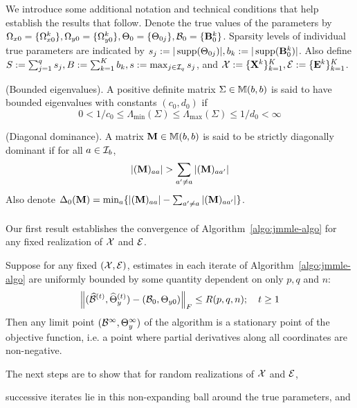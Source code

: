We introduce some additional notation and technical conditions that help establish the results that follow. Denote the true values of the parameters by $\Omega_{x 0} = \{ \Omega_{x 0}^k \}, \Omega_{y 0} = \{ \Omega_{y 0}^k \}, \Theta_0 = \{ \Theta_{0 j} \}, {\cal{B}}_0 = \{ {\mathbf{B}}_0^k \}$. Sparsity levels of individual true parameters are indicated by $s_j := | \operatorname*{supp} (\Theta_{0j})|, b_k := | \operatorname*{supp}({\mathbf{B}}^k_0) |$. Also define $S := \sum_{j=1}^q s_j, B:= \sum_{k=1}^K b_k, s:= \max_{j \in {\cal{I}}_q } s_j$, and ${\cal{X}} := \{ {\mathbf{X}}^k \}_{k=1}^K, {\cal{E}} := \{ {\mathbf{E}}^k \}_{k=1}^K$.

\vspace{1em}
 (Bounded eigenvalues). A positive definite matrix $\Sigma \in {\mathbb{M}}(b,b)$ is said to have bounded eigenvalues with constants $(c_0, d_0)$ if
%
\[
0 < 1/c_0 \leq \Lambda_{\min} (\Sigma) \leq \Lambda_{\max} (\Sigma) \leq 1/d_0 < \infty
\]

 (Diagonal dominance). A matrix ${\mathbf{M}}  \in {\mathbb{M}}(b,b)$ is said to be strictly diagonally dominant if for all $a \in {\cal{I}}_b$,
%
$$
| ({\mathbf{M}})_{aa} | > \sum_{a' \neq a} |({\mathbf{M}})_{aa'} |
$$
%
Also denote $\Delta_0 ({\mathbf{M}}) = \min_a \{ | ({\mathbf{M}})_{aa} | - \sum_{a' \neq a} |({\mathbf{M}})_{aa'} | \}$.

\paragraph{}
Our first result establishes the convergence of Algorithm~\ref{algo:jmmle-algo} for any fixed realization of ${\cal{X}}$ and ${\cal{E}}$.

\begin{theorem}
\label{thm:algo-convergence}
Suppose for any fixed $({\cal{X}}, {\cal{E}})$, estimates in each iterate of Algorithm~\ref{algo:jmmle-algo} are uniformly bounded by some quantity dependent on only $p, q$ and $n$:
%
\begin{align}
\left\| (\widehat {{\cal{B}}}^{(t)}, \widehat \Theta_y^{(t)}) - ( {\cal{B}}_0, \Theta_{y 0}) \right\|_F
\leq R(p,q,n);
\quad t \geq 1
\end{align}
%
Then any limit point $({\cal{B}}^\infty, \Theta_y^\infty)$ of the algorithm is a stationary point of the objective function, i.e. a point where partial derivatives along all coordinates are non-negative.
\end{theorem}

The next steps are to show that for random realizations of ${\cal{X}}$ and ${\cal{E}}$,
%

\vspace{1em}
 successive iterates lie in this non-expanding ball around the true parameters, and

